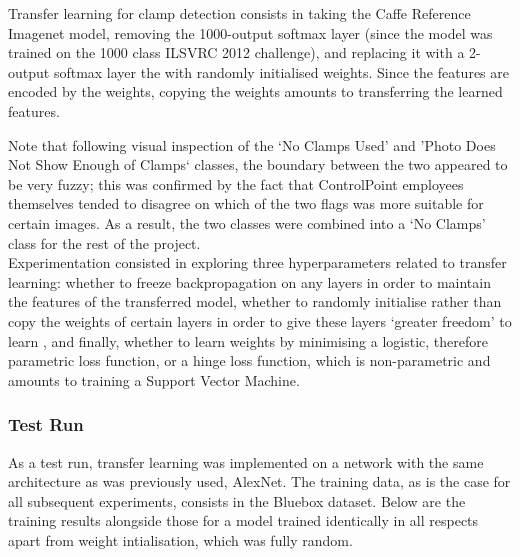 \documentclass[a4paper,11pt]{article}
\begin{document}
Transfer learning for clamp detection consists in taking the Caffe Reference Imagenet model, removing the 1000-output softmax layer (since the model was trained on the 1000 class ILSVRC 2012 challenge), and replacing it with a 2-output softmax layer the with randomly initialised weights. Since the features are encoded by the weights, copying the weights amounts to transferring the learned features.

Note that following visual inspection of the `No Clamps Used' and 'Photo Does Not Show Enough of Clamps` classes, the boundary between the two appeared to be very fuzzy; this was confirmed by the fact that ControlPoint employees themselves tended to disagree on which of the two flags was more suitable for certain images. As a result, the two classes were combined into a `No Clamps' class for the rest of the project. \\

Experimentation consisted in exploring three hyperparameters related to transfer learning: whether to freeze backpropagation on any layers in order to maintain the features of the transferred model, whether to randomly initialise rather than copy the weights of certain layers in order to give these layers `greater freedom' to learn \cite{transfer-learning}, and finally, whether to learn weights by minimising a logistic, therefore parametric loss function, or a hinge loss function, which is non-parametric and amounts to training a Support Vector Machine. 


\subsubsection{Test Run}

As a test run, transfer learning was implemented on a network with the same architecture as was previously used, AlexNet. The training data, as is the case for all subsequent experiments, consists in the Bluebox dataset. Below are the training results alongside those for a model trained identically in all respects apart from weight intialisation, which was fully random. 
\end{document}
